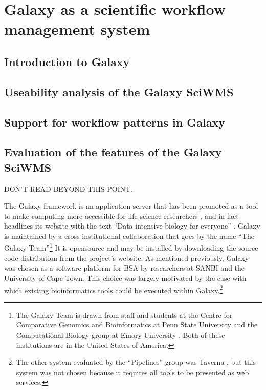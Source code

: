 \documentclass[a4paper,10pt]{scrreprt}
\begin{document}
\chapter{Galaxy as a scientific workflow management system}
\label{sec:galaxy_swms}

\section{Introduction to Galaxy}
\label{sec:galaxy_intro}

\section{Useability analysis of the Galaxy SciWMS}
\label{sec:galaxy_swms_useability}

\section{Support for workflow patterns in Galaxy}
\label{sec:galaxy_swms_patterns}

\section{Evaluation of the features of the Galaxy SciWMS}
\label{sec:galaxy_swms_features}

DON'T READ BEYOND THIS POINT.

The Galaxy framework is an application server that has been promoted as a tool to make computing more accessible for life science researchers \cite{goecks_galaxy:_2010}, and in fact headlines its website with the text ``Data intensive biology for everyone'' \cite{the_galaxy_team_galaxy_2012}. Galaxy is maintained by a cross-institutional collaboration that goes by the name ``The Galaxy Team''\footnote{The Galaxy Team is drawn from staff and students at the Centre for Comparative Genomics and Bioinformatics at Penn State University and the Computational Biology group at Emory University \cite{the_galaxy_team_galaxy_2012}. Both of these institutions are in the United States of America.} It is \gls{opensource} and may be installed by downloading the source code distribution from the project's website. As mentioned previously, Galaxy was chosen as a software platform for \gls{BSA} by researchers at SANBI and the University of Cape Town. This choice was largely motivated by the ease with which existing 
bioinformatics tools could be executed within Galaxy.\footnote{The other system evaluated by the ``Pipelines'' group was Taverna \cite{hull_taverna:_2006}, but this system was not chosen because it requires all tools to be presented as web services.}
\end{document}
